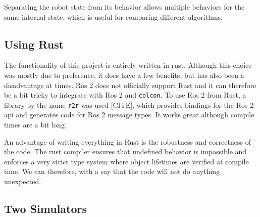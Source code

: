 Separating the robot state from its behavior allows multiple behaviors for the same internal state, which is useful for comparing different algorithms.

\subsection{Using Rust}
The {\color{red} functionality} of this project is entirely written in rust. Although this choice was mostly due to preference, it does have a few benefits, but has also been a {\color{red} disadvantage} at times. Ros 2 {\color{red} does not officially support Rust} and it can therefore be a bit tricky to integrate with Ros 2 and \texttt{colcon}. To use Ros 2 from Rust, a library by the name \texttt{r2r} was used {\color{red}[CITE]}, which provides bindings for the Ros 2 api and generates code for Ros 2 message types. It works great although compile times are a bit long.

An advantage of writing everything in Rust is the robustness and correctness of the code. The rust compiler ensures that undefined behavior is impossible and enforces a very strict type system where object lifetimes are verified at compile time. We can therefore, with a say that the code will not do anything unexpected.

\subsection{Two Simulators}
